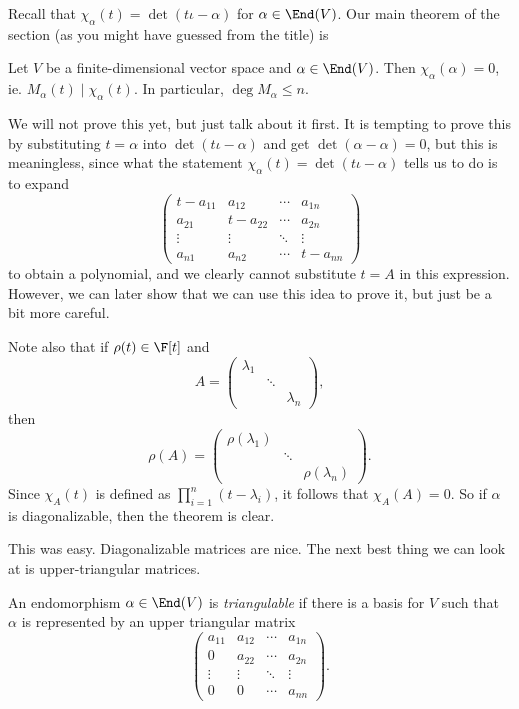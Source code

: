\documentclass[a4paper]{article}
\begin{document}
Recall that $\chi_\alpha(t) = \det (t\iota - \alpha)$ for $\alpha \in \End(V)$. Our main theorem of the section (as you might have guessed from the title) is
\begin{thm}
  Let $V$ be a finite-dimensional vector space and $\alpha \in \End(V)$. Then $\chi_\alpha(\alpha) = 0$, ie. $M_\alpha(t) \mid \chi_\alpha(t)$. In particular, $\deg M_\alpha \leq n$.
\end{thm}
We will not prove this yet, but just talk about it first. It is tempting to prove this by substituting $t = \alpha$ into $\det(t\iota - \alpha)$ and get $\det (\alpha - \alpha) = 0$, but this is meaningless, since what the statement $\chi_\alpha(t) = \det (t\iota - \alpha)$ tells us to do is to expand
\[
  \begin{pmatrix}
    t - a_{11} & a_{12} & \cdots & a_{1n}\\
    a_{21} & t - a_{22} & \cdots & a_{2n}\\
    \vdots & \vdots & \ddots & \vdots\\
    a_{n1} & a_{n2} & \cdots & t - a_{nn}
  \end{pmatrix}
\]
to obtain a polynomial, and we clearly cannot substitute $t = A$ in this expression. However, we can later show that we can use this idea to prove it, but just be a bit more careful.

Note also that if $\rho(t) \in \F[t]$ and
\[
  A =
  \begin{pmatrix}
    \lambda_1 &\\
    & \ddots\\
    & & \lambda_n
  \end{pmatrix},
\]
then
\[
  \rho(A) =
  \begin{pmatrix}
    \rho(\lambda_1) &\\
    & \ddots\\
    & & \rho(\lambda_n)
  \end{pmatrix}.
\]
Since $\chi_A(t)$ is defined as $\prod_{i = 1}^n (t - \lambda_i)$, it follows that $\chi_A(A) = 0$. So if $\alpha$ is diagonalizable, then the theorem is clear.

This was easy. Diagonalizable matrices are nice. The next best thing we can look at is upper-triangular matrices.
\begin{defi}[Triangulable]
  An endomorphism $\alpha \in \End(V)$ is \emph{triangulable} if there is a basis for $V$ such that $\alpha$ is represented by an upper triangular matrix
  \[
    \begin{pmatrix}
      a_{11} & a_{12} & \cdots & a_{1n}\\
      0 & a_{22} & \cdots & a_{2n}\\
      \vdots & \vdots & \ddots & \vdots\\
      0 & 0 & \cdots & a_{nn}
    \end{pmatrix}.
  \]
\end{defi}
\end{document}
